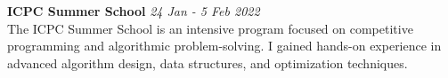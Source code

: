 \documentclass[a4paper,10pt]{article}
\begin{document}
\noindent\textbf{ICPC Summer School} \hfill \textit{24 Jan - 5 Feb 2022}\\
The ICPC Summer School is an intensive program focused on competitive programming and algorithmic problem-solving. I gained hands-on experience in advanced algorithm design, data structures, and optimization techniques.
\\
\end{document}
